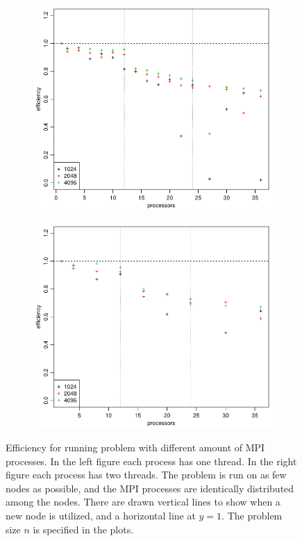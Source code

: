 \\
\begin{figure}[h!]
  \centering
  \begin{subfigure}[b]{0.48\textwidth}
    \includegraphics[width=\textwidth]{./Figures/taskbEfficiencyProc1.pdf}
  \end{subfigure}%
  \quad
  \begin{subfigure}[b]{0.48\textwidth}
    \includegraphics[width=\textwidth]{./Figures/taskbEfficiencyProc2.pdf}
  \end{subfigure}
  \vspace{-0.1\baselineskip}
	\caption{Efficiency for running problem with different amount of MPI processes. In the left figure each process has one thread. In the right figure each process has two threads. The problem is run on as few nodes as possible, and the MPI processes are identically distributed among the nodes. There are drawn vertical lines to show when a new node is utilized, and a horizontal line at $y=1$. The problem size $n$ is specified in the plots.} 
  \label{fig:Efficiency}
\end{figure}
